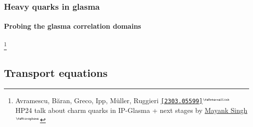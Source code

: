 \documentclass[aspectratio=169,11pt,usenames,dvipsnames]{beamer}
\renewcommand{\thefootnote}{\color{customblue}\faPaperPlaneO}
\newcommand\blfootnote[1]{%
  \begingroup
  \renewcommand\thefootnote{}\footnote{#1}%
  \addtocounter{footnote}{-1}%
  \endgroup
}
\begin{document}

\begin{frame}{}
    \frametitle{\\ Heavy quarks in glasma}
    \framesubtitle{Probing the glasma correlation domains}
    \blfootnote{\scriptsize Avramescu, Băran, Greco, Ipp, Müller, Ruggieri  \href{https://arxiv.org/abs/2303.05599}{{\color{palgold}\texttt{[2303.05599]}$^\text{\tiny\faExternalLink}$}}\\ 
    \hspace{16.5pt}HP24 talk about charm quarks in IP-Glasma + next stages by \href{https://indico.cern.ch/event/1339555/contributions/6040854/}{{\color{palgold}Mayank Singh$^\text{\tiny\faMicrophone}$}}}
\end{frame}


\subsection{Transport equations}

\end{document}
